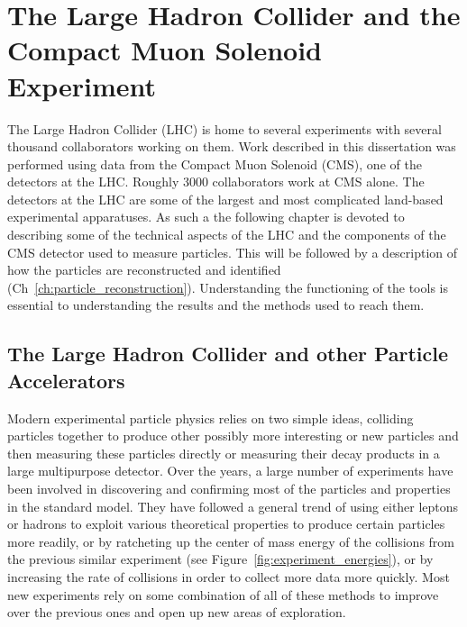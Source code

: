\chapter{The Large Hadron Collider and the Compact Muon Solenoid Experiment}
\label{ch:LHC}

The Large Hadron Collider (LHC) is home to several experiments with several thousand collaborators working on them. Work described in this dissertation was performed using data from the Compact Muon Solenoid (CMS), one of the detectors at the LHC. Roughly 3000 collaborators work at CMS alone. The detectors at the LHC are some of the largest and most complicated land-based experimental apparatuses. As such a the following chapter is devoted to describing some of the technical aspects of the LHC and the components of the CMS detector used to measure particles. This will be followed by a description of how the particles are reconstructed and identified (Ch~\ref{ch:particle_reconstruction}). Understanding the functioning of the tools is essential to understanding the results and the methods used to reach them.\\

	\section{The Large Hadron Collider and other Particle Accelerators}
	Modern experimental particle physics relies on two simple ideas, colliding particles together to produce other possibly more interesting or new particles and then measuring these particles directly or measuring their decay products in a large multipurpose detector. Over the years, a large number of experiments have been involved in discovering and confirming most of the particles and properties in the standard model. They have followed a general trend of using either leptons or hadrons to exploit various theoretical properties to produce certain particles more readily, or by ratcheting up the center of mass energy of the collisions from the previous similar experiment (see Figure~\ref{fig:experiment_energies}), or by increasing the rate of collisions in order to collect more data more quickly. Most new experiments rely on some combination of all of these methods to improve over the previous ones and open up new areas of exploration.\\
	
